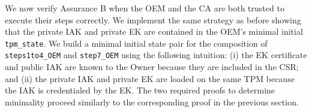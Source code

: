 \documentclass[runningheads]{llncs}
\begin{document}


We now verify Assurance B when the OEM and the CA are both trusted to
execute their steps correctly. We implement the same strategy as
before showing that the private IAK and private EK are contained in
the OEM's minimal initial \verb|tpm_state|. We build a minimal initial
state pair for the composition of \verb|steps1to4_OEM| and
\verb|step7_OEM| using the following intuition: (i) the EK certificate
and public IAK are known to the Owner because they are included in the
CSR; and (ii) the private IAK and private EK are loaded on the same TPM
because the IAK is credentialed by the EK. The two required proofs to
determine minimality proceed similarly to the corresponding proof in
the previous section.
\end{document}
